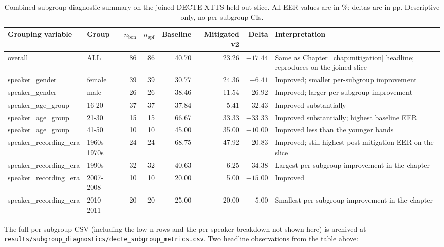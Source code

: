 \begin{table}[t]
\centering
\caption{Combined subgroup diagnostic summary on the joined DECTE XTTS held-out slice. All EER values are in \%; deltas are in pp. Descriptive only, no per-subgroup CIs.}
\label{tab:subgroup-summary}
\scriptsize
\setlength{\tabcolsep}{3pt}
\begin{tabularx}{\linewidth}{@{}l l r r r r r X@{}}
\toprule
\textbf{Grouping variable} & \textbf{Group} & \textbf{$n_\text{bon}$} & \textbf{$n_\text{spf}$} & \textbf{Baseline} & \textbf{Mitigated v2} & \textbf{Delta} & \textbf{Interpretation} \\
\midrule
overall               & ALL         & 86 & 86 & 40.70 & 23.26 & $-17.44$          & Same as Chapter~\ref{chap:mitigation} headline; reproduces on the joined slice \\
speaker\_gender        & female      & 39 & 39 & 30.77 & 24.36 & $-6.41$           & Improved; smaller per-subgroup improvement \\
speaker\_gender        & male        & 26 & 26 & 38.46 & 11.54 & $-26.92$          & Improved; larger per-subgroup improvement \\
speaker\_age\_group     & 16-20       & 37 & 37 & 37.84 & 5.41  & $-32.43$          & Improved substantially \\
speaker\_age\_group     & 21-30       & 15 & 15 & 66.67 & 33.33 & $-33.33$          & Improved substantially; highest baseline EER \\
speaker\_age\_group     & 41-50       & 10 & 10 & 45.00 & 35.00 & $-10.00$          & Improved less than the younger bands \\
speaker\_recording\_era & 1960s-1970s & 24 & 24 & 68.75 & 47.92 & $-20.83$          & Improved; still highest post-mitigation EER on the slice \\
speaker\_recording\_era & 1990s       & 32 & 32 & 40.63 & 6.25  & $\mathbf{-34.38}$ & Largest per-subgroup improvement in the chapter \\
speaker\_recording\_era & 2007-2008   & 10 & 10 & 20.00 & 5.00  & $-15.00$          & Improved \\
speaker\_recording\_era & 2010-2011   & 20 & 20 & 25.00 & 20.00 & $\mathbf{-5.00}$  & Smallest per-subgroup improvement in the chapter \\
\bottomrule
\end{tabularx}
\end{table}

The full per-subgroup CSV (including the low-n rows and the
per-speaker breakdown not shown here) is archived at
\texttt{results/}\allowbreak\texttt{subgroup\_diagnostics/}\allowbreak\texttt{decte\_subgroup\_metrics.csv}. Two
headline observations from the table above:

